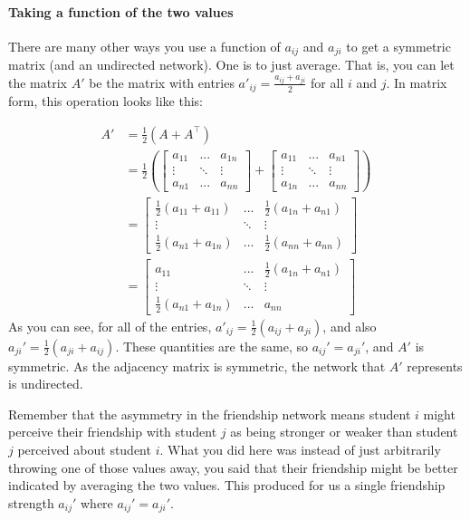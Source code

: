 \paragraph{Taking a function of the two values}

There are many other ways you use a function of $a_{ij}$ and $a_{ji}$ to get a symmetric matrix (and an undirected network). One is to just average. That is, you can let the matrix $A'$ be the matrix with entries $a'_{ij} = \frac{a_{ij} + a_{ji}}{2}$ for all $i$ and $j$. In matrix form, this operation looks like this:

\begin{align*}
    A' &= \frac{1}{2} (A + A^\top) \\
    &= \frac{1}{2}\left(\begin{bmatrix}
        a_{11} & ... & a_{1n} \\
        \vdots & \ddots & \vdots \\
        a_{n1} & ... & a_{nn}
    \end{bmatrix} + \begin{bmatrix}
        a_{11} & ... & a_{n1} \\
        \vdots & \ddots & \vdots \\
        a_{1n} & ... & a_{nn}
    \end{bmatrix}\right)\\
    &= \begin{bmatrix}
        \frac{1}{2}(a_{11} + a_{11}) & ... & \frac{1}{2}(a_{1n} + a_{n1}) \\
        \vdots & \ddots & \vdots \\
        \frac{1}{2} (a_{n1} + a_{1n}) & ... & \frac{1}{2}(a_{nn} + a_{nn})
    \end{bmatrix} \\
    &= \begin{bmatrix}
        a_{11} & ... & \frac{1}{2}(a_{1n} + a_{n1}) \\
        \vdots & \ddots & \vdots \\
        \frac{1}{2} (a_{n1} + a_{1n}) & ... & a_{nn}
    \end{bmatrix}
\end{align*}
As you can see, for all of the entries, $a'_{ij} = \frac{1}{2} (a_{ij} + a_{ji})$, and also $a_{ji}' = \frac{1}{2}(a_{ji} + a_{ij})$. These quantities are the same, so $a_{ij}' = a_{ji}'$, and $A'$ is symmetric. As the adjacency matrix is symmetric, the network that $A'$ represents is undirected.

Remember that the asymmetry in the friendship network means student $i$ might perceive their friendship with student $j$ as being stronger or weaker than student $j$ perceived about student $i$. What you did here was instead of just arbitrarily throwing one of those values away, you said that their friendship might be better indicated by averaging the two values. This produced for us a single friendship strength $a_{ij}'$ where $a_{ij}' = a_{ji}'$.

